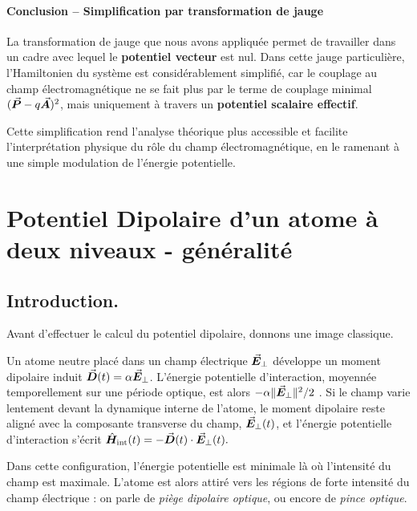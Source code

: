 \paragraph{Conclusion – Simplification par transformation de jauge}
\bigskip
La transformation de jauge que nous avons appliquée permet de travailler dans un cadre avec lequel le{ \bf  potentiel vecteur} est nul. Dans cette jauge particulière, l'Hamiltonien du système est considérablement simplifié, car le couplage au champ électromagnétique ne se fait plus par le terme de couplage minimal \((\vec{{\bm{P}}} - q \vec{{\bm{A}}})^2\), mais uniquement à travers un {\bf potentiel scalaire effectif}.

Cette simplification rend l’analyse théorique plus accessible et facilite l’interprétation physique du rôle du champ électromagnétique, en le ramenant à une simple modulation de l’énergie potentielle.




\section{Potentiel Dipolaire d'un atome à deux niveaux - généralité}

\subsection*{Introduction.}
Avant d'effectuer le calcul du potentiel dipolaire, donnons une image classique.

\smallskip

Un atome neutre placé dans un champ électrique $\vec{{\bm{E}}}_\perp$ développe un moment dipolaire induit $\vec{{\bm{D}}}(t) = \alpha \vec{{\bm{E}}}_\perp$. L'énergie potentielle d'interaction, moyennée temporellement sur une période optique, est alors $-\alpha \Vert\vec{{\bm{E}}}_\perp\Vert^2/2$ . Si le champ varie lentement devant la dynamique interne de l’atome, le moment dipolaire reste aligné avec la composante transverse du champ, $\vec{{\bm{E}}}_\perp(t)$, et l’énergie potentielle d’interaction s’écrit 
\(
 \hat{\bm{H}}_{\text{int}}(t) = -\vec{{\bm{D}}}(t) \cdot \vec{{\bm{E}}}_\perp(t).
\)

Dans cette configuration, l’énergie potentielle est minimale là où l’intensité du champ est maximale. L’atome est alors attiré vers les régions de forte intensité du champ électrique : on parle de \textit{piège dipolaire optique}, ou encore de \textit{pince optique}.


